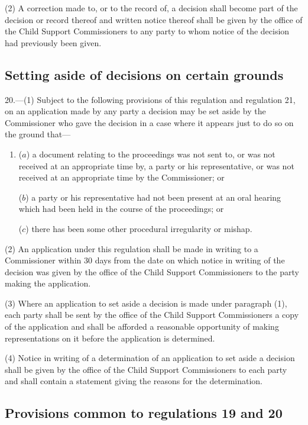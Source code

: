 \documentclass[a4paper]{article}
\begin{document}
(2) A correction made to, or to the record of, a decision shall become part of the decision or record thereof and written notice thereof shall be given by the office of the Child Support Commissioners to any party to whom notice of the decision had previously been given.

\subsection[20. Setting aside of decisions on certain grounds]{Setting aside of decisions on certain grounds}

20.—(1) Subject to the following provisions of this regulation and regulation 21, on an application made by any party a decision may be set aside by the Commissioner who gave the decision in a case where it appears just to do so on the ground that—
\begin{enumerate}\item[]
($a$) a document relating to the proceedings was not sent to, or was not received at an appropriate time by, a party or his representative, or was not received at an appropriate time by the Commissioner; or

($b$) a party or his representative had not been present at an oral hearing which had been held in the course of the proceedings; or

($c$) there has been some other procedural irregularity or mishap.
\end{enumerate}

(2) An application under this regulation shall be made in writing to a Commissioner within 30 days from the date on which notice in writing of the decision was given by the office of the Child Support Commissioners to the party making the application.

(3) Where an application to set aside a decision is made under paragraph (1), each party shall be sent by the office of the Child Support Commissioners a copy of the application and shall be afforded a reasonable opportunity of making representations on it before the application is determined.

(4) Notice in writing of a determination of an application to set aside a decision shall be given by the office of the Child Support Commissioners to each party and shall contain a statement giving the reasons for the determination.

\subsection[21. Provisions common to regulations 19 and 20]{Provisions common to regulations 19 and 20}
\end{document}
